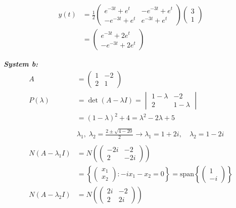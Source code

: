 \documentclass{article}
\begin{document}
\begin{align*}
    \\
    y(t) &= \frac{1}{2} \begin{pmatrix} e^{-3t} + e^t & -e^{-3t} + e^t \\ -e^{-3t} + e^t & e^{-3t} + e^t \end{pmatrix} \begin{pmatrix} 3 \\ 1 \end{pmatrix} \\
    &= \begin{pmatrix} e^{-3t} + 2e^t \\ -e^{-3t} + 2e^t \end{pmatrix}
\end{align*}

\newpage
\noindent\textbf{\textit{System b:}}
\begin{align*}
    A &= \begin{pmatrix} 1 & -2 \\ 2 & 1 \end{pmatrix} \\
    P(\lambda) &= \det(A - \lambda I) = \begin{vmatrix} 1 - \lambda & -2 \\ 2 & 1 - \lambda \end{vmatrix} \\
    &= (1 - \lambda)^2 + 4 = \lambda^2 - 2\lambda + 5 \\
    \\
    &\lambda_1,\; \lambda_2 = \frac{2 \pm \sqrt{4 - 20}}{2} \rightarrow \lambda_1 = 1 + 2i, \quad \lambda_2 = 1 - 2i \\
    \\
    N(A - \lambda_1 I) &= N\left(\begin{pmatrix} -2i & -2 \\ 2 & -2i \end{pmatrix}\right) \\
    &= \left\{ \begin{pmatrix} x_1 \\ x_2 \end{pmatrix} : -ix_1 - x_2 = 0 \right\}
    = \text{span}\left\{ \begin{pmatrix} 1 \\ -i \end{pmatrix} \right\} \\
    N(A - \lambda_2 I) &= N\left(\begin{pmatrix} 2i & -2 \\ 2 & 2i \end{pmatrix}\right) \\

\end{align*}
\end{document}
